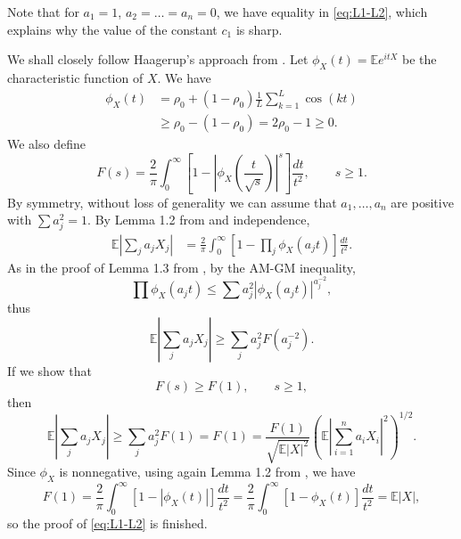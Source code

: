 \documentclass[10pt]{article}
\newcommand{\E}{\mathbb{E}}
\newcommand{\1}{\textbf{1}}
\theoremstyle{remark}
\theoremstyle{definition}
\begin{document}
Note that for $a_1 = 1$, $a_2 = \dots = a_n = 0$, we have equality in \eqref{eq:L1-L2}, which explains why the value of the constant $c_1$ is sharp.

We shall closely follow Haagerup's approach from \cite{Haa}. Let $\phi_X(t) = \E e^{itX}$ be the characteristic function of $X$. We have
\begin{align*}
\phi_X(t) &= \rho_0 + (1-\rho_0)\frac{1}{L}\sum_{k=1}^L \cos(kt) \\
&\geq \rho_0 -(1-\rho_0) = 2\rho_0 -1 \geq 0.
\end{align*}
We also define
\[
F(s) = \frac{2}{\pi}\int_0^\infty\left[1 - \left|\phi_X\left(\frac{t}{\sqrt{s}}\right)\right|^s\right]\frac{dt}{t^2}, \qquad s \geq 1.
\]
By symmetry, without loss of generality we can assume that $a_1, \ldots, a_n$ are positive with $\sum a_j^2 = 1$. By Lemma 1.2 from \cite{Haa} and independence,
\begin{align*}
\E\left|\sum_j a_j X_j\right| &= \frac{2}{\pi}\int_0^\infty \left[ 1 - \prod_j \phi_X(a_jt) \right] \frac{dt}{t^2}.
\end{align*}
As in the proof of Lemma 1.3 from \cite{Haa}, by the AM-GM inequality, 
\[
\prod \phi_X(a_jt) \leq \sum a_j^{2}|\phi_X(a_jt)|^{a_j^{-2}},
\]
thus
\[
\E\left|\sum_j a_j X_j\right| \geq \sum_j a_j^2F(a_j^{-2}).
\]
If we show that
\begin{equation}\label{eq:F>F(1)}
F(s) \geq F(1), \qquad s \geq 1,
\end{equation}
then
\[
\E\left|\sum_j a_j X_j\right| \geq \sum_j a_j^2F(1) = F(1) = \frac{F(1)}{\sqrt{\E |X|^2}}\left(\E\left|\sum_{i=1}^n a_iX_i \right|^2\right)^{1/2}.
\]
Since $\phi_X$ is nonnegative, using again Lemma 1.2 from \cite{Haa}, we have 
\[
F(1) = \frac{2}{\pi}\int_0^\infty\left[1 - \left|\phi_X\left(t\right)\right|\right]\frac{dt}{t^2} = \frac{2}{\pi}\int_0^\infty\left[1 - \phi_X\left(t\right)\right]\frac{dt}{t^2} = \E|X|,
\]
so the proof of \eqref{eq:L1-L2} is finished. 
\end{document}
